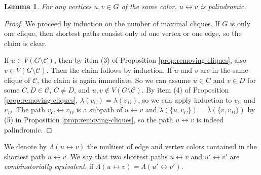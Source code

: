 \documentclass[a4paper, 11pt]{amsart}
\numberwithin{theorem}{section}
\newtheorem{lemma}[theorem]{Lemma}
\begin{document}
\begin{lemma}\label{lemma:symmetry}
    For any vertices $u,v\in G$ of the same color, $u\leftrightarrow
    v$ is palindromic.
\end{lemma}
\begin{proof}
    We proceed by induction on the number of maximal cliques. If $G$
    is only one clique, then shortest paths consist only of one vertex
    or one edge, so the claim is clear.

    If $u\in V(G\setminus\mathcal C)$, then by item (3) of Proposition
    \ref{prop:removing-cliques}, also $v\in V(G\setminus\mathcal C)$.
    Then the claim follows by induction. If $u$ and $v$ are in the
    same clique of $\mathcal{C}$, the claim is again immediate. So we
    can assume $u\in C$ and $v\in D$ for some $C,D\in\mathcal C$,
    $C\neq D$, and $u,v\not\in V(G\setminus \mathcal C)$. By item (4)
    of Proposition \ref{prop:removing-cliques}, $\lambda(v_C) =
    \lambda(v_D)$, so we can apply induction to $v_C$ and $v_D$. The
    path $v_C\leftrightarrow v_D$ is a subpath of $u\leftrightarrow v$
    and $\lambda(\{u,v_C\}) = \lambda(\{v,v_D\})$ by (5) in Proposition \ref{prop:removing-cliques}, so the path
    $u\leftrightarrow v$ is indeed palindromic.
\end{proof}

We denote by $ \Lambda (u \leftrightarrow v)$ the multiset of edge and vertex colors contained in the shortest path $u\leftrightarrow v$. We say that two shortest paths $u\leftrightarrow v$ and $u'\leftrightarrow v'$ are \emph{combinatorially equivalent}, if $ \Lambda (u \leftrightarrow v) = \Lambda (u' \leftrightarrow v')$. 
\end{document}
